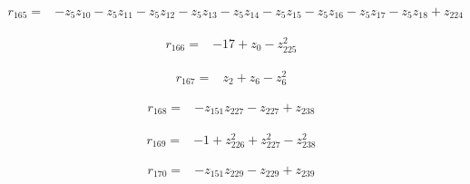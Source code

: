 \par\noindent\begin{minipage}{\linewidth}
\begin{align*}
r_{165}={}&-z_{5}z_{10}-z_{5}z_{11}-z_{5}z_{12}-z_{5}z_{13}-z_{5}z_{14}-z_{5}z_{15}-z_{5}z_{16}-z_{5}z_{17}-z_{5}z_{18}+z_{224}
\end{align*}
\end{minipage}\par
\par\noindent\begin{minipage}{\linewidth}
\begin{align*}
r_{166}={}&-17+z_{0}-z_{225}^{2}
\end{align*}
\end{minipage}\par
\par\noindent\begin{minipage}{\linewidth}
\begin{align*}
r_{167}={}&z_{2}+z_{6}-z_{6}^{2}
\end{align*}
\end{minipage}\par
\par\noindent\begin{minipage}{\linewidth}
\begin{align*}
r_{168}={}&-z_{151}z_{227}-z_{227}+z_{238}
\end{align*}
\end{minipage}\par
\par\noindent\begin{minipage}{\linewidth}
\begin{align*}
r_{169}={}&-1+z_{226}^{2}+z_{227}^{2}-z_{238}^{2}
\end{align*}
\end{minipage}\par
\par\noindent\begin{minipage}{\linewidth}
\begin{align*}
r_{170}={}&-z_{151}z_{229}-z_{229}+z_{239}
\end{align*}
\end{minipage}\par
